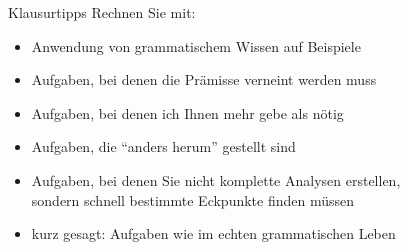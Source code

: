 \begin{frame}
  {Klausurtipps}
  \pause
  \alert{Rechnen Sie mit:}
  \Halbzeile
  \pause
  \begin{itemize}
    \item<4> Anwendung von grammatischem Wissen auf Beispiele
    \item<5> Aufgaben, bei denen die Prämisse verneint werden muss
    \item<6> Aufgaben, bei denen ich Ihnen mehr gebe als nötig
    \item<7> Aufgaben, die "`anders herum"' gestellt sind
    \item<8> Aufgaben, bei denen Sie nicht komplette Analysen erstellen,\\
      sondern schnell bestimmte Eckpunkte finden müssen
    \item<9> kurz gesagt: Aufgaben wie im echten grammatischen Leben
  \end{itemize}
\end{frame}

